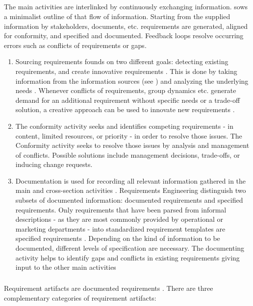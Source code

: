 \subparagraph{}\label{beginmain} The main activities are interlinked by continuously exchanging information.  sows a minimalist outline of that flow of information. Starting from the supplied information by stakeholders, documents, etc. requirements are generated, aligned for conformity, and specified and documented. Feedback loops resolve occurring errors such as conflicts of requirements or gaps.
\begin{enumerate}
    \item Sourcing requirements founds on two different goals: detecting existing requirements, and create innovative requirements \parencite[cf.][318, 321]{Pohl.2007}. This is done by taking information from the information sources (see ) and analyzing the underlying needs \parencite[cf.][75-76]{Sommerville.2000}. Whenever conflicts of requirements, group dynamics etc. generate demand for an additional requirement without specific needs or a trade-off solution, a creative approach can be used to innovate new requirements \parencite[cf.][94]{Lauesen.2008}. 
    \item The conformity activity seeks and identifies competing requirements - in content, limited resources, or priority - in order to resolve those issues. The Conformity activity seeks to resolve those issues by analysis and management of conflicts. Possible solutions include management decisions, trade-offs, or inducing change requests. \parencite[cf.][393]{Pohl.2007}
    \item{Documentation} is used for recording all relevant information gathered in the main and cross-section activities \parencite[cf.][217]{Pohl.2007}. Requirements Engineering distinguish two subsets of documented information: documented requirements and specified requirements. Only requirements that have been parsed from informal descriptions - as they are most commonly provided by operational or marketing departments - into standardized requirement templates are specified requirements \parencite[cf.][101]{Ebert.2014}. Depending on the kind of information to be documented, different levels of specification are necessary. The documenting activity helps to identify gaps and conflicts in existing requirements giving input to the other main activities \parencite[212]{Pohl.2007}\label{endmain}
\end{enumerate}

\subparagraph{} Requirement artifacts are documented requirements \parencite[85]{Pohl.2007}. There are three complementary categories of requirement artifacts: 

